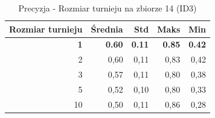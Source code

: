 \begin{table}[htbp]
\centering
\small
\setlength{\tabcolsep}{6pt}
\renewcommand{\arraystretch}{1.2}
\caption{Precyzja - Rozmiar turnieju na zbiorze 14 (ID3)}
\label{tab:ID3_tournament_size_14_precision}
\begin{tabular}{r|r|r|r|r}
\toprule
Rozmiar turnieju & Średnia & Std & Maks & Min \\
\hline
\textbf{1} & \textbf{0.60} & \textbf{0.11} & \textbf{0.85} & \textbf{0.42} \\
2 & 0,60 & 0,11 & 0,83 & 0,42 \\
3 & 0,57 & 0,11 & 0,80 & 0,38 \\
5 & 0,52 & 0,10 & 0,80 & 0,33 \\
10 & 0,50 & 0,11 & 0,86 & 0,28 \\
\bottomrule
\end{tabular}
\end{table}